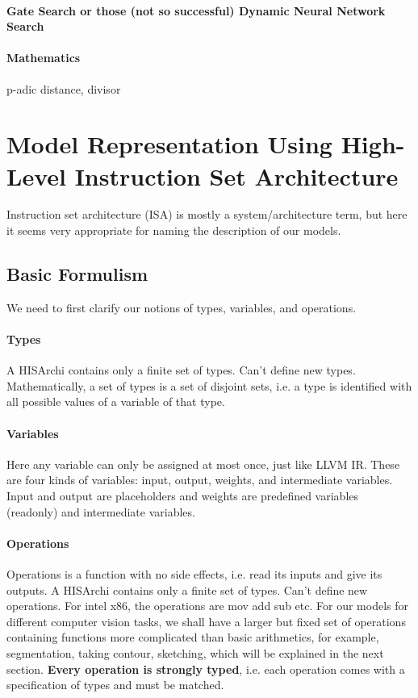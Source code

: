 \documentclass[10pt, oneside]{article}   	%
\theoremstyle{definition}
\begin{document}
\paragraph{Gate Search or those (not so successful) Dynamic Neural Network Search}
\paragraph{Mathematics} p-adic distance, divisor
\section{Model Representation Using High-Level Instruction Set Architecture}
Instruction set architecture (ISA) is mostly a system/architecture term, but here it seems very appropriate for naming the description of our models.
\subsection{Basic Formulism}
We need to first clarify our notions of types, variables, and operations.
\paragraph{Types} A HISArchi contains only a finite set of types. Can't define new types. Mathematically, a set of types is a set of disjoint sets, i.e. a type is identified with all possible values of a variable of that type.
\paragraph{Variables} Here any variable can only be assigned at most once, just like LLVM IR. These are four kinds of variables: input, output, weights, and intermediate variables. Input and output are placeholders and weights are predefined variables (readonly) and intermediate variables.
\paragraph{Operations} Operations is a function with no side effects, i.e. read its inputs and give its outputs. A HISArchi contains only a finite set of types. Can't define new operations. For intel x86, the operations are mov add sub etc. For our models for different computer vision tasks, we shall have a larger but fixed set of operations containing functions more complicated than basic arithmetics, for example, segmentation, taking contour, sketching, which will be explained in the next section. \textbf{Every operation is strongly typed}, i.e. each operation comes with a specification of types and must be matched.
\end{document}
